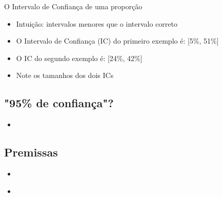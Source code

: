 \documentclass{beamer}
\begin{document}
\begin{frame}{O Intervalo de Confiança de uma proporção}
  \begin{itemize}
  \item Intuição: intervalos menores que o intervalo correto
  \item O \alert{Intervalo de Confiança} (IC) do primeiro exemplo é: [5\%, 51\%]
  \item O IC do segundo exemplo é: [24\%, 42\%]
  \item<2-> Note os tamanhos dos dois ICs
  \end{itemize}
\end{frame}


\subsection{"95\% de confiança"?}

\begin{frame}
  \begin{itemize}
  \item 
  \end{itemize}
\end{frame}

\subsection{Premissas}

\begin{frame}
  \begin{itemize}
  \item 
  \end{itemize}
\end{frame}

\begin{frame}
  \begin{itemize}
  \item 
  \end{itemize}
\end{frame}
\end{document}
